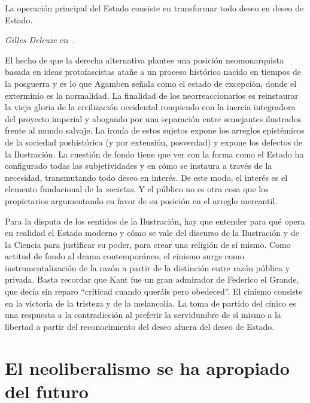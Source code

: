 \epigraph{La operación principal del Estado consiste en transformar todo deseo en deseo de Estado.}{\emph{Gilles Deleuze} en~\autocite{deleuzeMilMesetasCapitalismo2002}.}

El hecho de que la derecha alternativa plantee una posición neomonarquista basada en ideas protofascistas atañe a un proceso histórico nacido en tiempos de la posguerra y es lo que Agamben señala como el estado de excepción, donde el exterminio es la normalidad. La finalidad de los neorreaccionarios es reinstaurar la vieja gloria de la civilización occidental rompiendo con la inercia integradora del proyecto imperial y abogando por una separación entre semejantes ilustrados frente al mundo salvaje. La ironía de estos sujetos expone los arreglos epistémicos de la sociedad poshistórica (y por extensión, posverdad) y expone los defectos de la Ilustración. La cuestión de fondo tiene que ver con la forma como el Estado ha configurado todas las subjetividades y en cómo se instaura a través de la necesidad, transmutando todo deseo en interés. De este modo, el interés es el elemento fundacional de la \emph{societas}. Y el público no es otra cosa que los propietarios argumentando en favor de su posición en el arreglo mercantil.

Para la disputa de los sentidos de la Ilustración, hay que entender para qué opera en realidad el Estado moderno y cómo se vale del discurso de la Ilustración y de la Ciencia para justificar su poder, para crear una religión de sí mismo. Como actitud de fondo al drama contemporáneo, el cinismo surge como instrumentalización de la razón a partir de la distinción entre razón pública y privada. Basta recordar que Kant fue un gran admirador de Federico el Grande, que decía sin reparo \enquote{críticad cuando queráis pero obedeced}. El cinismo consiste en la victoria de la tristeza y de la melancolía. La toma de partido del cínico es una respuesta a la contradicción al preferir la servidumbre de sí mismo a la libertad a partir del reconocimiento del deseo afuera del deseo de Estado.

\section{El neoliberalismo se ha apropiado del futuro}
\label{sec:el-neoliberalismo-se-ha-apropiado-del-futuro}

